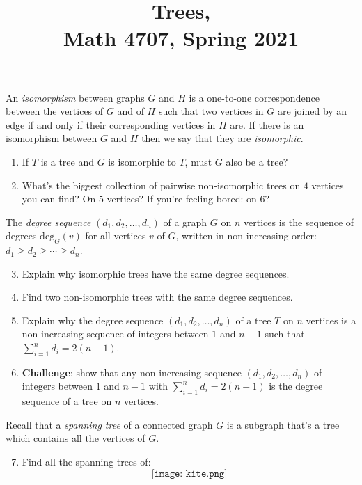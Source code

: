 \documentclass[11pt]{article}
\title{Trees, \\ Math 4707, Spring 2021}
\date{}
\begin{document}
\maketitle

\vspace{-1cm}

\thispagestyle{empty}

An \emph{isomorphism} between graphs $G$ and $H$ is a one-to-one correspondence between the vertices of $G$ and of $H$ such that two vertices in $G$ are joined by an edge if and only if their corresponding vertices in $H$ are. If there is an isomorphism between $G$ and $H$ then we say that they are \emph{isomorphic}.

\begin{enumerate}

\item If $T$ is a tree and $G$ is isomorphic to $T$, must $G$ also be a tree?

\item What's the biggest collection of pairwise non-isomorphic trees on $4$ vertices you can find? On $5$ vertices? If you're feeling bored: on $6$?

\end{enumerate}

The \emph{degree sequence} $(d_1, d_2, \ldots, d_n)$ of a graph $G$ on $n$ vertices is the sequence of degrees $\mathrm{deg}_G(v)$ for all vertices $v$ of $G$, written in non-increasing order: $d_1\geq d_2 \geq \cdots \geq d_n$.

\begin{enumerate}

\setcounter{enumi}{2}

\item Explain why isomorphic trees have the same degree sequences.

\item Find two non-isomorphic trees with the same degree sequences.

\item Explain why the degree sequence $(d_1, d_2, \ldots, d_n)$ of a tree $T$ on $n$ vertices is a non-increasing sequence of integers between $1$ and $n-1$ such that $\sum_{i=1}^{n} d_i = 2(n-1)$.

\item {\bf Challenge}: show that any non-increasing sequence $(d_1, d_2, \ldots, d_n)$ of integers between $1$ and $n-1$ with $\sum_{i=1}^{n} d_i = 2(n-1)$ is the degree sequence of a tree on $n$ vertices.

\end{enumerate}

Recall that a \emph{spanning tree} of a connected graph $G$ is a subgraph that's a tree which contains all the vertices of $G$.

\begin{enumerate}
\setcounter{enumi}{6}
\item Find all the spanning trees of:
\[\texttt{[image: kite.png]}\]
\end{enumerate}
\end{document}

